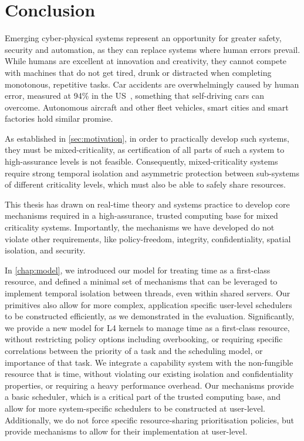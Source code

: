 \chapter{Conclusion}
\label{chap:conclusion}

Emerging cyber-physical systems represent an opportunity for greater safety, security and 
automation, as they can replace systems where human errors prevail. While humans are excellent at
innovation and creativity, they cannot compete with machines that do not get tired, drunk or
distracted when completing
monotonous, repetitive tasks. Car accidents are overwhelmingly 
caused by human error, measured at 94\% in the US~\citep{Singh_15}, something that self-driving cars can overcome. Autonomous aircraft and other fleet vehicles, smart cities and smart factories hold similar promise. 

As established in \cref{sec:motivation}, in order to practically develop such systems,
they must be mixed-criticality, as certification of all parts of such a system to high-assurance
levels is not feasible. Consequently, mixed-criticality systems require strong temporal isolation
and asymmetric protection between sub-systems of different criticality levels, 
which must also be able to safely share resources.

This thesis has drawn on real-time theory and systems practice to develop core mechanisms required
in a high-assurance, trusted computing base for mixed criticality systems. Importantly, the
mechanisms we have developed do not violate other requirements, like policy-freedom, integrity,
confidentiality, spatial isolation, and security. 

In \cref{chap:model}, we introduced our model for treating time as a first-class resource, and 
defined a minimal set of
mechanisms that can be leveraged to implement temporal isolation between threads, even within shared
servers. Our primitives also allow for more complex, application specific user-level schedulers to
be constructed efficiently, as we demonstrated in the evaluation. Significantly, we provide a
new model for L4 kernels to manage time as a first-class resource, without restricting policy
options including overbooking, 
or requiring specific correlations between the priority of a task and the scheduling model, or
importance of that task. 
We integrate a capability system with the non-fungible resource that is time, without violating our
existing isolation and confidentiality properties, or requiring a heavy performance overhead.
Our mechanisms provide a basic scheduler, which is a critical part of the
trusted computing base, and allow for more system-specific schedulers to be constructed at
user-level. Additionally, we do not force specific
resource-sharing prioritisation policies, but provide mechanisms to allow for their implementation at user-level. 
\clearpage

